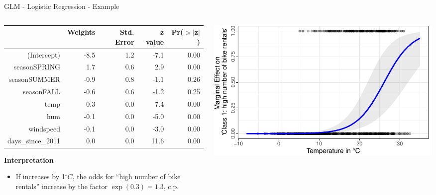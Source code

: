 \documentclass[11pt,compress,t,notes=noshow, aspectratio=169, xcolor=table]{beamer}
\begin{document}
\begin{frame}{GLM - Logistic Regression - Example}
\begin{columns}[T]
\begin{column}{0.45\textwidth}
\begin{table}[ht]
\centering
\tiny
\begin{tabular}{rrrrr}
  \hline
 & Weights & Std. Error & z value & Pr($>$$|$z$|$) \\ 
  \hline
(Intercept) & -8.5 & 1.2 & -7.1 & 0.00 \\ 
  seasonSPRING & 1.7 & 0.6 & 2.9 & 0.00 \\ 
  seasonSUMMER & -0.9 & 0.8 & -1.1 & 0.26 \\ 
  seasonFALL & -0.6 & 0.6 & -1.2 & 0.25 \\ 
  temp & 0.3 & 0.0 & 7.4 & 0.00 \\ 
  hum & -0.1 & 0.0 & -5.0 & 0.00 \\ 
  windspeed & -0.1 & 0.0 & -3.0 & 0.00 \\ 
  days\_since\_2011 & 0.0 & 0.0 & 11.6 & 0.00 \\ 
   \hline
\end{tabular}
\end{table}
\pause
\textbf{Interpretation}
\begin{itemize}
    \item If  increases by 1$^\circ C$, the odds for ``high number of bike rentals'' increase by the factor $\exp (0.3) = 1.3$, c.p.
\end{itemize}
\end{column}
\hfill
\pause
\begin{column}{0.5\textwidth}
\includegraphics[width = \textwidth]{figure/logistic_marginal_temp.pdf}
\end{column}
\end{columns}

\end{frame}


\endlecture
\end{document}
